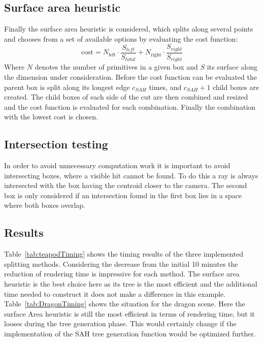 \subsection{Surface area heuristic}
Finally the surface area heuristic is considered, which splits along several points and chooses from a set of available options by evaluating the cost function:
\begin{equation}
\text{cost} = N_{\text{left}} \cdot \frac{S_{left}}{S_{total}} +
              N_{\text{right}} \cdot \frac{S_{right}}{S_{right}}
\end{equation}
Where $N$ denotes the number of primitives in a given box and $S$ its surface along the dimension under consideration. Before the cost function can be evaluated the parent box is split along its longest edge $c_{SAH}$ times, and $c_{SAH} + 1$ child boxes are created. The child boxes of each side of the cut are then combined and resized and the cost function is evaluated for each combination. Finally the combination with the lowest cost is chosen. 

\subsection{Intersection testing}
In order to avoid unnecessary computation work it is important to avoid intersecting boxes, where a visible hit cannot be found. To do this a ray is always intersected with the box having the centroid closer to the camera. The second box is only considered if an intersection found in the first box lies in a space where both boxes overlap. 

\subsection{Results}
Table~\ref{tab:teapodTiming} shows the timing results of the three implemented splitting methods. Considering the decrease from the initial 10 minutes the reduction of rendering time is impressive for each method. The surface area heuristic is the best choice here as its tree is the most efficient and the additional time needed to construct it does not make a difference in this example. Table~\ref{tab:DragonTiming} shows the situation for the dragon scene. Here the surface Area heuristic is still the most efficient in terms of rendering time, but it looses during the tree generation phase. This would certainly change if the implementation of the SAH tree generation function would be optimized further.  

